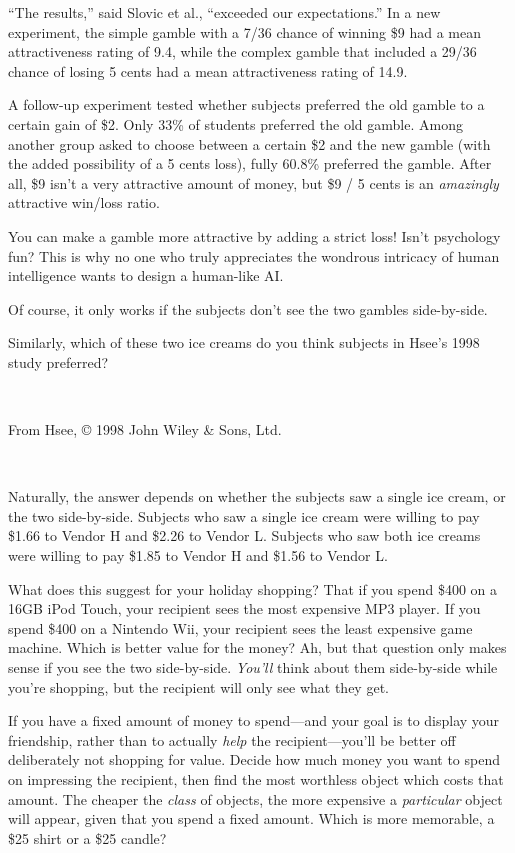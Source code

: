 {
 ``The results,'' said Slovic et
al., ``exceeded our expectations.''
In a new experiment, the simple gamble with a 7/36 chance of winning
\$9 had a mean attractiveness rating of 9.4, while the complex gamble
that included a 29/36 chance of losing 5 cents had a mean
attractiveness rating of 14.9.}

{
 A follow-up experiment tested whether subjects preferred the old
gamble to a certain gain of \$2. Only 33\% of students preferred the
old gamble. Among another group asked to choose between a certain \$2
and the new gamble (with the added possibility of a 5 cents loss),
fully 60.8\% preferred the gamble. After all, \$9 isn't
a very attractive amount of money, but \$9 / 5 cents is an
\textit{amazingly} attractive win/loss ratio.}

{
 You can make a gamble more attractive by adding a strict loss!
Isn't psychology fun? This is why no one who truly
appreciates the wondrous intricacy of human intelligence wants to
design a human-like AI.}

{
 Of course, it only works if the subjects don't see
the two gambles side-by-side.}

{
 Similarly, which of these two ice creams do you think subjects in
Hsee's 1998 study preferred?}

{
 ~}


{\centering
{}
 \newline
 From Hsee, © 1998 John Wiley \& Sons, Ltd.
\par}


\bigskip

{
 ~}

{
 Naturally, the answer depends on whether the subjects saw a single
ice cream, or the two side-by-side. Subjects who saw a single ice cream
were willing to pay \$1.66 to Vendor H and \$2.26 to Vendor L. Subjects
who saw both ice creams were willing to pay \$1.85 to Vendor H and
\$1.56 to Vendor L.}

{
 What does this suggest for your holiday shopping? That if you
spend \$400 on a 16GB iPod Touch, your recipient sees the most
expensive MP3 player. If you spend \$400 on a Nintendo Wii, your
recipient sees the least expensive game machine. Which is better value
for the money? Ah, but that question only makes sense if you see the
two side-by-side. \textit{You'll} think about them
side-by-side while you're shopping, but the recipient
will only see what they get.}

{
 If you have a fixed amount of money to spend---and your goal is to
display your friendship, rather than to actually \textit{help} the
recipient---you'll be better off deliberately not
shopping for value. Decide how much money you want to spend on
impressing the recipient, then find the most worthless object which
costs that amount. The cheaper the \textit{class} of objects, the more
expensive a \textit{particular} object will appear, given that you
spend a fixed amount. Which is more memorable, a \$25 shirt or a \$25
candle?}

